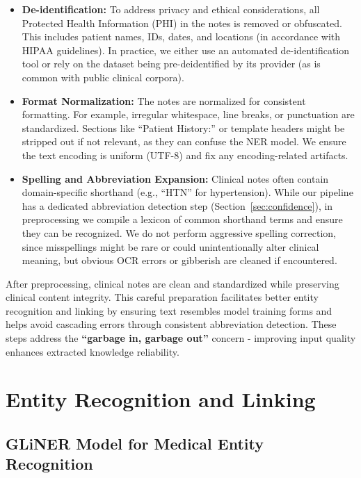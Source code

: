 \begin{itemize}
\item \textbf{De-identification:} To address privacy and ethical considerations, all Protected Health Information (PHI) in the notes is removed or obfuscated. This includes patient names, IDs, dates, and locations (in accordance with HIPAA guidelines). In practice, we either use an automated de-identification tool or rely on the dataset being pre-deidentified by its provider (as is common with public clinical corpora).
\item \textbf{Format Normalization:} The notes are normalized for consistent formatting. For example, irregular whitespace, line breaks, or punctuation are standardized. Sections like ``Patient History:'' or template headers might be stripped out if not relevant, as they can confuse the NER model. We ensure the text encoding is uniform (UTF-8) and fix any encoding-related artifacts.
\item \textbf{Spelling and Abbreviation Expansion:} Clinical notes often contain domain-specific shorthand (e.g., ``HTN'' for hypertension). While our pipeline has a dedicated abbreviation detection step (Section~\ref{sec:confidence}), in preprocessing we compile a lexicon of common shorthand terms and ensure they can be recognized. We do not perform aggressive spelling correction, since misspellings might be rare or could unintentionally alter clinical meaning, but obvious OCR errors or gibberish are cleaned if encountered.
\end{itemize}

After preprocessing, clinical notes are clean and standardized while preserving clinical content integrity. This careful preparation facilitates better entity recognition and linking by ensuring text resembles model training forms and helps avoid cascading errors through consistent abbreviation detection. These steps address the \textbf{``garbage in, garbage out''} concern - improving input quality enhances extracted knowledge reliability.

\section{Entity Recognition and Linking}

\subsection{GLiNER Model for Medical Entity Recognition}
\label{sec:gliner}


